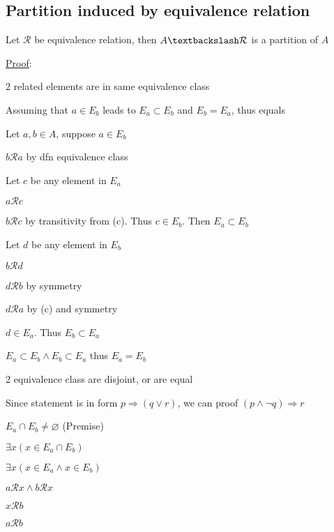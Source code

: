 \documentclass[12pt]{article}
\begin{document}
\begin{spacing}{1.5}
\subsection{Partition induced by equivalence relation}

Let $\mathcal{R}$ be equivalence relation, then $A \textbackslash \mathcal{R}$ is a partition of $A$

\underline{Proof}:

\begin{enumerate*}
	\item 2 related elements are in same equivalence class
		\begin{enumerate*}
			\item Assuming that $a \in E_b$ leads to $E_a \subset E_b$ and $E_b = E_a$, thus equals
			\item Let $a, b \in A$, suppose $a \in E_b$
			\item $b \mathcal{R} a$ by dfn equivalence class
			\item Let $c$ be any element in $E_a$
			\item $a \mathcal{R} c$
			\item $b \mathcal{R} c$ by transitivity from (c). Thus $c \in E_b$. Then $E_a \subset E_b$
			\item Let $d$ be any element in $E_b$
			\item $b \mathcal{R} d$
			\item $d \mathcal{R} b$ by symmetry
			\item $d \mathcal{R} a$ by (c) and symmetry
			\item $d \in E_a$. Thus $E_b \subset E_a$
			\item $E_a \subset E_b \wedge E_b \subset E_a$ thus $E_a = E_b$
		\end{enumerate*}
	\item 2 equivalence class are disjoint, or are equal
		\begin{enumerate*}
			\item Since statement is in form $p \Rightarrow (q \vee r)$, we can proof $(p \wedge \neg q) \Rightarrow r$
			\item $E_a \cap E_b \neq \varnothing$ (Premise)
			\item $\exists x (x \in E_a \cap E_b)$
			\item $\exists x (x \in E_a \wedge x \in E_b)$
			\item $a \mathcal{R} x \wedge b \mathcal{R} x$
			\item $x \mathcal{R} b$
			\item $a \mathcal{R} b$

\end{enumerate*}
\end{enumerate*}
\end{spacing}
\end{document}
